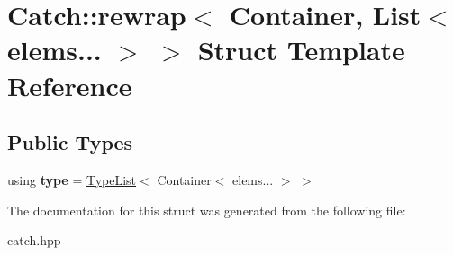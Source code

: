 \hypertarget{structCatch_1_1rewrap_3_01Container_00_01List_3_01elems_8_8_8_01_4_01_4}{}\section{Catch\+::rewrap$<$ Container, List$<$ elems... $>$ $>$ Struct Template Reference}
\label{structCatch_1_1rewrap_3_01Container_00_01List_3_01elems_8_8_8_01_4_01_4}
\subsection*{Public Types}
\begin{DoxyCompactItemize}
\item 
\mbox{\label{structCatch_1_1rewrap_3_01Container_00_01List_3_01elems_8_8_8_01_4_01_4_ac61d11b30e96c1d6e684ead867efc8ba}} 
using {\bfseries type} = \mbox{\hyperlink{structCatch_1_1TypeList}{Type\+List}}$<$ Container$<$ elems... $>$ $>$
\end{DoxyCompactItemize}


The documentation for this struct was generated from the following file\+:\begin{DoxyCompactItemize}
\item 
catch.\+hpp\end{DoxyCompactItemize}
